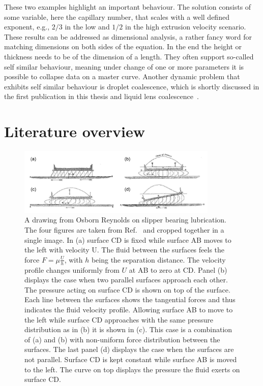 These two examples highlight an important behaviour.
The solution consists of some variable, here the capillary number, that scales with a well defined exponent, e.g., $2/3$ in the low and $1/2$ in the high extrusion velocity scenario.
These results can be addressed as dimensional analysis, a rather fancy word for matching dimensions on both sides of the equation.
In the end the height or thickness needs to be of the dimension of a length.
They often support so-called self similar behaviour, meaning under change of one or more parameters it is possible to collapse data on a master curve. 
Another dynamic problem that exhibits self similar behaviour is droplet coalescence, which is shortly discussed in the first publication in this thesis and liquid lens coalescence~\cite{hackSelfSimilarLiquidLens2020, scheelViscousInertialCoalescence2023}. 
\section{Literature overview}
\label{section:literature}
\begin{figure}
    \centering
    \includegraphics[width=0.85\textwidth]{graphics/reynolds_slip_bearing.pdf}
    \caption{A drawing from Osborn Reynolds on slipper bearing lubrication.
    The four figures are taken from Ref.~\cite{reynoldsTheoryLubricationIts1886} and cropped together in a single image.
    In (a) surface CD is fixed while surface AB moves to the left with velocity U. 
    The fluid between the surfaces feels the force $F = \mu \frac{U}{h}$, with $h$ being the separation distance.
    The velocity profile changes uniformly from $U$ at AB to zero at CD. 
    Panel (b) displays the case when two parallel surfaces approach each other.
    The pressure acting on surface CD is shown on top of the surface.
    Each line between the surfaces shows the tangential forces and thus indicates the fluid velocity profile.
    Allowing surface AB to move to the left while surface CD approaches with the same pressure distribution as in (b) it is shown in (c).
    This case is a combination of (a) and (b) with non-uniform force distribution between the surfaces.
    The last panel (d) displays the case when the surfaces are not parallel.
    Surface CD is kept constant while surface AB is moved to the left.
    The curve on top displays the pressure the fluid exerts on surface CD.}
    \label{fig:reynolds_work}
\end{figure}

